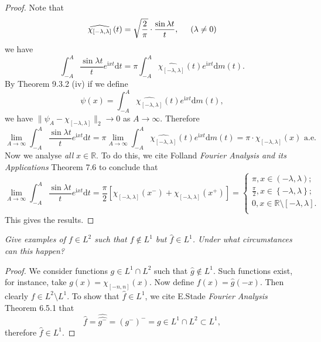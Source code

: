 \begin{proof}
Note that 
$$
\widehat{\chi _{\left[ -\lambda ,\lambda \right]}}\left( t \right) =\sqrt{\frac{2}{\pi}}\cdot \frac{\sin \lambda t}{t},\hspace{0.5cm}\left( \lambda \ne 0 \right) 
$$
we have 
$$
\int_{-A}^A{\frac{\sin \lambda t}{t}e^{\mathrm{i}xt}\mathrm{d}t}=\pi \int_{-A}^A{\widehat{\chi _{\left[ -\lambda ,\lambda \right]}}\left( t \right) e^{\mathrm{i}xt}\mathrm{d}m\left( t \right)}.
$$
By Theorem 9.3.2 (iv) if we define 
$$
\psi \left( x \right) =\int_{-A}^A{\widehat{\chi _{\left[ -\lambda ,\lambda \right]}}\left( t \right) e^{\mathrm{i}xt}\mathrm{d}m\left( t \right)},
$$
we have $\|\psi_A-\chi_{[-\lambda,\lambda]}\|_2\to 0$ as $A\to\infty$. Therefore 
$$
\lim_{A\rightarrow \infty} \int_{-A}^A{\frac{\sin \lambda t}{t}e^{\mathrm{i}xt}\mathrm{d}t}=\pi \lim_{A\rightarrow \infty} \int_{-A}^A{\widehat{\chi _{\left[ -\lambda ,\lambda \right]}}\left( t \right) e^{\mathrm{i}xt}\mathrm{d}m\left( t \right)}=\pi \cdot \chi _{\left[ -\lambda ,\lambda \right]}\left( x \right) \,\,\mathrm{a}.\mathrm{e}.
$$
Now we analyse \textit{all} $x\in\mathbb{R}$. To do this, we cite Folland \textit{Fourier Analysis and its Applications} Theorem 7.6 to conclude that 
$$
\lim_{A\rightarrow \infty} \int_{-A}^A{\frac{\sin \lambda t}{t}e^{\mathrm{i}xt}\mathrm{d}t}=\frac{\pi}{2}\left[ \chi _{\left[ -\lambda ,\lambda \right]}\left( x^- \right) +\chi _{\left[ -\lambda ,\lambda \right]}\left( x^+ \right) \right] =\begin{cases}
	\pi ,x\in \left( -\lambda ,\lambda \right) ;\\
	\frac{\pi}{2},x\in \left\{ -\lambda ,\lambda \right\} ;\\
	0,x\in \mathbb{R} \setminus \left[ -\lambda ,\lambda \right] .\\
\end{cases}
$$
This gives the results.
\end{proof}
\begin{problem}\em
Give examples of $f\in L^2$ such that $f\notin L^1$ but $\widehat{f}\in L^1$. Under what circumstances can this happen?
\end{problem}
\begin{proof}
We consider functions $g\in L^1\cap L^2$ such that $\widehat{g}\notin L^1$. Such functions exist, for instance, take $g(x)=\chi_{[-n,n]}(x)$. Now define $f(x)=\widehat{g}(-x)$. Then clearly $f\in L^2\setminus L^1$. To show that $\widehat{f}\in L^1$, we cite E.Stade \textit{Fourier Analysis} Theorem 6.5.1 that 
$$
\widehat{f}=\widehat{\widehat{g^-}}=\left( g^- \right) ^-=g\in L^1\cap L^2\subset L^1,
$$
therefore $\widehat{f}\in L^1$.
\end{proof}
